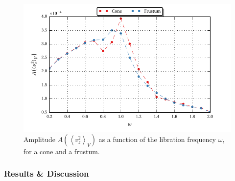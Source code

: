 \clearpage
%

\begin{figure}[!bp]
  \centering
  \includegraphics{gfx/cone/experiment/experiment.pdf}
  \caption{Amplitude $A\left(\left<v^2_z\right>_V\right)$ as a function of the libration frequency $\omega$,
            for a cone and a frustum.  \label{fig:cone_expseries} }
\end{figure}

\subsubsection{Results \& Discussion}
\label{cone:exp}

